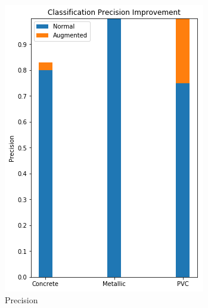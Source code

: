 \begin{figure}[H]
\begin{subfigure}[b]{0.4\linewidth}
    \includegraphics[width=\linewidth]{figures/Frequency-Precision.png}
    \caption{Precision}
  \end{subfigure}
  \begin{subfigure}[b]{0.4\linewidth}

\end{subfigure}
\end{figure}
